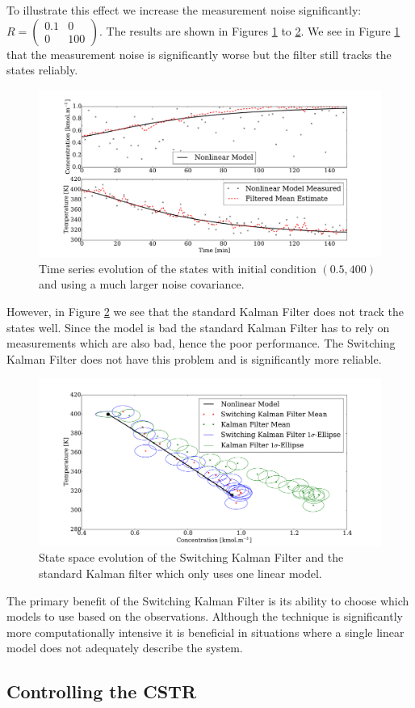 \documentclass[../masters.tex]{subfiles}
\begin{document}
To illustrate this effect we increase the measurement noise significantly: $R=\begin{pmatrix}
0.1 & 0 \\ 0 & 100
\end{pmatrix}$. The results are shown in Figures  \ref{fig_7mod_t_m2_b} to \ref{fig_7mod_p_m2_b}. We see in Figure \ref{fig_7mod_t_m2_b} that the measurement noise is significantly worse but the filter still tracks the states reliably.
\begin{figure}[H] 
\centering
\includegraphics[scale=0.3]{skf_s7_t_m2_b.pdf}
\caption{Time series evolution of the states with initial condition $(0.5, 400)$ and using a much larger noise covariance.}
\label{fig_7mod_t_m2_b}
\end{figure}
However, in Figure \ref{fig_7mod_p_m2_b} we see that the standard Kalman Filter does not track the states well. Since the model is bad the standard Kalman Filter has to rely on measurements which are also bad, hence the poor performance. The Switching Kalman Filter does not have this problem and is significantly more reliable.
\begin{figure}[H] 
\centering
\includegraphics[scale=0.3]{skf_s7_p_m2_b.pdf}
\caption{State space evolution of the Switching Kalman Filter and the standard Kalman filter which only uses one linear model.}
\label{fig_7mod_p_m2_b}
\end{figure}
The primary benefit of the Switching Kalman Filter is its ability to choose which models to use based on the observations. Although the technique is significantly more computationally intensive it is beneficial in situations where a single linear model does not adequately describe the system. 






\subsection{Controlling the CSTR}


%
%
\end{document}
